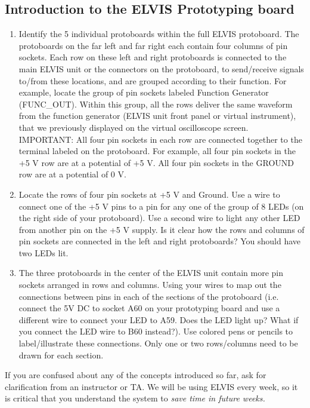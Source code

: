 \documentclass{article}
\begin{document}
\subsection*{Introduction to the ELVIS Prototyping board}
\begin{enumerate}
	\item Identify the 5 individual protoboards within the full ELVIS protoboard. The protoboards on the far left and far right each contain four columns of pin sockets. Each row on these left and right protoboards is connected to the main ELVIS unit or the connectors on the protoboard, to send/receive signals to/from these locations, and are grouped according to their function. For example, locate the group of pin sockets labeled Function Generator (FUNC\_OUT). Within this group, all the rows deliver the same waveform from the function generator (ELVIS unit front panel or virtual instrument), that we previously displayed on the virtual oscilloscope screen. IMPORTANT: All four pin sockets in each row are connected together to the terminal labeled on the protoboard. For example, all four pin sockets in the +5 V row are at a potential of +5 V. All four pin sockets in the GROUND row are at a potential of 0 V.
	\item Locate the rows of four pin sockets at +5 V and Ground. Use a wire to connect one of the +5 V pins to a pin for any one of the group of 8 LEDs (on the right side of your protoboard). Use a second wire to light any other LED from another pin on the +5 V supply. Is it clear how the rows and columns of pin sockets are connected in the left and right protoboards? You should have two LEDs lit.
	\item The three protoboards in the center of the ELVIS unit contain more pin sockets arranged in rows and columns. Using your wires to map out the connections between pins in each of the sections of the protoboard (i.e. connect the 5V DC to socket A60 on your prototyping board and use a different wire to connect your LED to A59. Does the LED light up? What if you connect the LED wire to B60 instead?). Use colored pens or pencils to label/illustrate these connections. Only one or two rows/columns need to be drawn for each section.
\end{enumerate}

\begin{warn}
	If you are confused about any of the concepts introduced so far, ask for clarification from an instructor or TA. We will be using ELVIS every week, so it is critical that you understand the system to \textit{save time in future weeks.} 
\end{warn}
\end{document}
